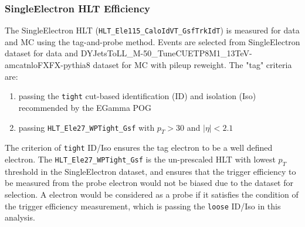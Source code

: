 \subsubsection{SingleElectron HLT Efficiency}
The SingleElectron HLT (\texttt{HLT\_Ele115\_CaloIdVT\_GsfTrkIdT}) is measured for data and MC using the tag-and-probe method. Events are selected from SingleElectron dataset for data and DYJetsToLL\_M-50\_TuneCUETP8M1\_13TeV-amcatnloFXFX-pythia8 dataset for MC with pileup reweight. The "tag" criteria are:
\begin{enumerate}
\item passing the \texttt{tight} cut-based identification (ID) and isolation (Iso) recommended by the EGamma POG %
\item passing \texttt{HLT\_Ele27\_WPTight\_Gsf} with $p_T>30$ and $|\eta|<2.1$
\end{enumerate}


The criterion of \texttt{tight} ID/Iso ensures the tag electron to be a well defined electron. The \texttt{HLT\_Ele27\_WPTight\_Gsf} is the un-prescaled HLT with lowest $p_T$ threshold in the SingleElectron dataset, and ensures that the trigger efficiency to be measured from the probe electron would not be biased due to the dataset for selection. A electron would be considered as a probe if it satisfies the condition of the trigger efficiency measurement, which is passing the \texttt{loose} ID/Iso in this analysis.

